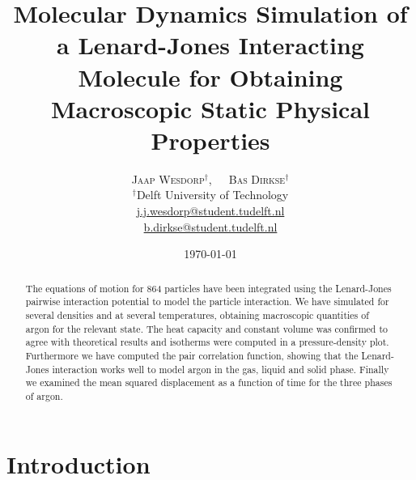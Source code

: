 \documentclass[twoside]{article}
\title{\vspace{-15mm}\fontsize{18pt}{10pt}\selectfont\textbf{Molecular Dynamics Simulation of a Lenard-Jones Interacting Molecule for Obtaining Macroscopic Static Physical Properties}} %
\author{
	\large
	\textsc{Jaap Wesdorp}$^\dagger$, $\hspace{10pt}$ \textsc{Bas Dirkse}$^\dagger$ \\ %
	\normalsize $^\dagger$Delft University of Technology \\ %
	\normalsize \href{mailto:j.j.wesdorp@student.tudelft.nl}{j.j.wesdorp@student.tudelft.nl} \\
	\normalsize \href{mailto:b.dirkse@student.tudelft.nl}{b.dirkse@student.tudelft.nl} 
}
\date{\today\vspace{-8mm}}
\begin{document}


\maketitle %
\thispagestyle{firststyle} %


\begin{abstract}
\noindent  
The equations of motion for 864 particles have been integrated using the Lenard-Jones pairwise interaction potential to model the particle interaction. We have simulated for several densities and at several temperatures, obtaining macroscopic quantities of argon for the relevant state. The heat capacity and constant volume was confirmed to agree with theoretical results and isotherms were computed in a pressure-density plot. Furthermore we have computed the pair correlation function, showing that the Lenard-Jones interaction works well to model argon in the gas, liquid and solid phase. Finally we examined the mean squared displacement as a function of time for the three phases of argon.

	
\end{abstract}


\section{Introduction}
\end{document}
